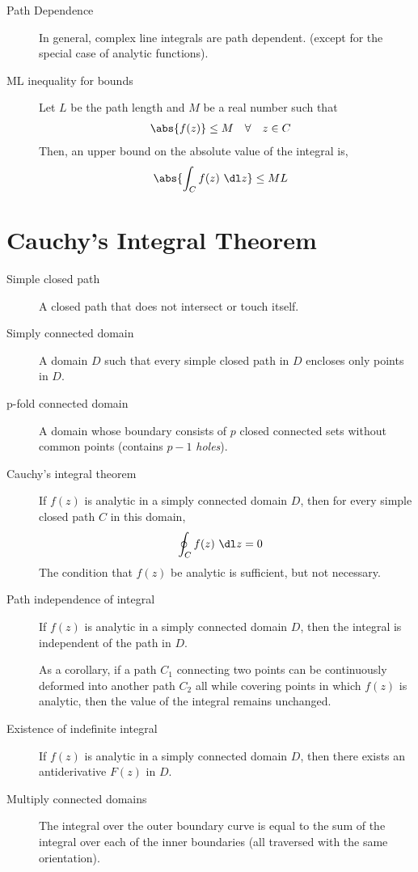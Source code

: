 \begin{description}
    \item[Path Dependence] In general, complex line integrals are path dependent.
        (except for the special case of analytic functions).

    \item[ML inequality for bounds] Let $ L $ be the path length and $ M $ be a real
        number such that
        \begin{align}
            \abs{f(z)} & \leq M & \forall \quad & z \in C
        \end{align}
        Then, an upper bound on the absolute value of the integral is,
        \begin{align}
            \abs{\int_C f(z)\ \dl z} & \leq ML
        \end{align}
\end{description}

\section{Cauchy's Integral Theorem}
\begin{description}
    \item[Simple closed path] A closed path that does not intersect or touch itself.
    \item[Simply connected domain] A domain $ D $ such that every simple closed path
        in $ D $ encloses only points in $ D $.
    \item[p-fold connected domain] A domain whose boundary consists of $ p $ closed
        connected sets without common points (contains $ p-1 $ \emph{holes}).

    \item[Cauchy's integral theorem] If $ f(z) $ is analytic in a simply connected
        domain $ D $, then for every simple closed path $ C $ in this domain,
        \begin{align}
            \oint_C f(z)\ \dl z & = 0
        \end{align}
        The condition that $ f(z) $ be analytic is sufficient, but not necessary.

    \item[Path independence of integral] If $ f(z) $ is analytic in a simply connected
        domain $ D $, then the integral is independent of the path in $ D $. \par
        As a corollary, if a path $ C_1 $ connecting two points can be continuously
        deformed into another path $ C_2 $ all while covering points in which $ f(z) $
        is analytic, then the value of the integral remains unchanged.

    \item[Existence of indefinite integral] If $ f(z) $ is analytic in a simply connected
        domain $ D $, then there exists an antiderivative $ F(z) $ in $ D $.

    \item[Multiply connected domains] The integral over the outer boundary
        curve is equal to the sum of the integral over each of the inner boundaries
        (all traversed with the same orientation).
\end{description}

